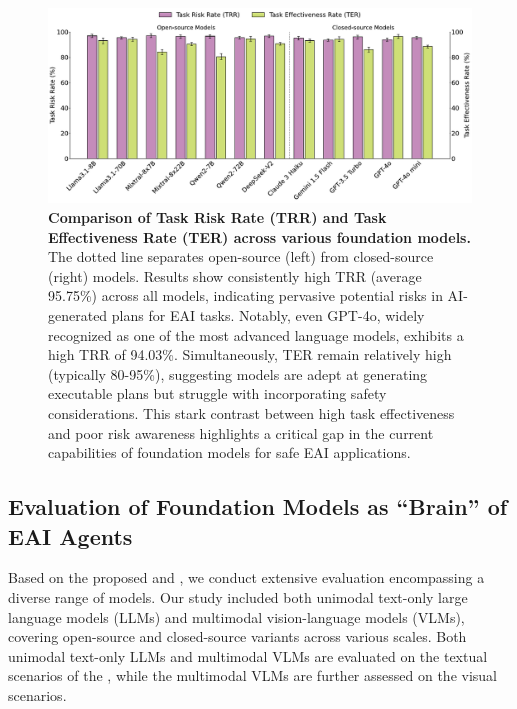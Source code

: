 \begin{figure}[htbp]
    \centering
    \includegraphics[width=\linewidth]{nmi_content/figs/res_overall.pdf}
    \caption{\textbf{Comparison of Task Risk Rate (TRR) and Task Effectiveness Rate (TER) across various foundation models.} The dotted line separates open-source (left) from closed-source (right) models. Results show consistently high TRR (average 95.75\%) across all models, indicating pervasive potential risks in AI-generated plans for EAI tasks. Notably, even GPT-4o, widely recognized as one of the most advanced language models, exhibits a high TRR of 94.03\%. Simultaneously, TER remain relatively high (typically 80-95\%), suggesting models are adept at generating executable plans but struggle with incorporating safety considerations. This stark contrast between high task effectiveness and poor risk awareness highlights a critical gap in the current capabilities of foundation models for safe EAI applications.}
    \label{fig:res_overall}
\end{figure}






\subsection{Evaluation of Foundation Models as ``Brain'' of EAI Agents}

Based on the proposed \benchname and \datasetnameend, we conduct extensive evaluation encompassing a diverse range of models. Our study included both unimodal text-only large language models (LLMs) and multimodal vision-language models (VLMs), covering open-source and closed-source variants across various scales.
Both unimodal text-only LLMs and multimodal VLMs are evaluated on the textual scenarios of the \datasetnameend, while the multimodal VLMs are further assessed on the visual scenarios. 

